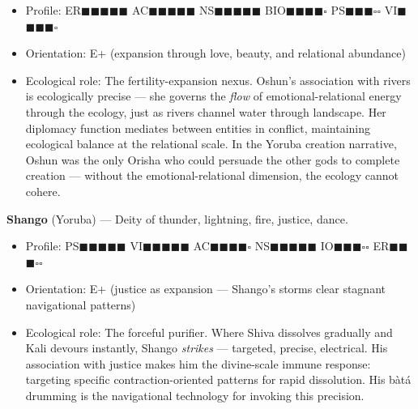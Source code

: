 \begin{itemize}[nosep,leftmargin=*]
  \item Profile: ER$\blacksquare$$\blacksquare$$\blacksquare$$\blacksquare$$\blacksquare$ AC$\blacksquare$$\blacksquare$$\blacksquare$$\blacksquare$$\blacksquare$ NS$\blacksquare$$\blacksquare$$\blacksquare$$\blacksquare$$\blacksquare$ BIO$\blacksquare$$\blacksquare$$\blacksquare$$\blacksquare$$\square$ PS$\blacksquare$$\blacksquare$$\blacksquare$$\square$$\square$ VI$\blacksquare$$\blacksquare$$\blacksquare$$\blacksquare$$\square$
  \item Orientation: E+ (expansion through love, beauty, and relational abundance)
  \item Ecological role: The fertility-expansion nexus. Oshun's association with rivers is ecologically precise — she governs the \textit{flow} of emotional-relational energy through the ecology, just as rivers channel water through landscape. Her diplomacy function mediates between entities in conflict, maintaining ecological balance at the relational scale. In the Yoruba creation narrative, Oshun was the only Orisha who could persuade the other gods to complete creation — without the emotional-relational dimension, the ecology cannot cohere.
\end{itemize}


\textbf{Shango} (Yoruba) — Deity of thunder, lightning, fire, justice, dance.

\begin{itemize}[nosep,leftmargin=*]
  \item Profile: PS$\blacksquare$$\blacksquare$$\blacksquare$$\blacksquare$$\blacksquare$ VI$\blacksquare$$\blacksquare$$\blacksquare$$\blacksquare$$\blacksquare$ AC$\blacksquare$$\blacksquare$$\blacksquare$$\blacksquare$$\square$ NS$\blacksquare$$\blacksquare$$\blacksquare$$\blacksquare$$\blacksquare$ IO$\blacksquare$$\blacksquare$$\blacksquare$$\square$$\square$ ER$\blacksquare$$\blacksquare$$\blacksquare$$\square$$\square$
  \item Orientation: E+ (justice as expansion — Shango's storms clear stagnant navigational patterns)
  \item Ecological role: The forceful purifier. Where Shiva dissolves gradually and Kali devours instantly, Shango \textit{strikes} — targeted, precise, electrical. His association with justice makes him the divine-scale immune response: targeting specific contraction-oriented patterns for rapid dissolution. His bàtá drumming is the navigational technology for invoking this precision.
\end{itemize}



